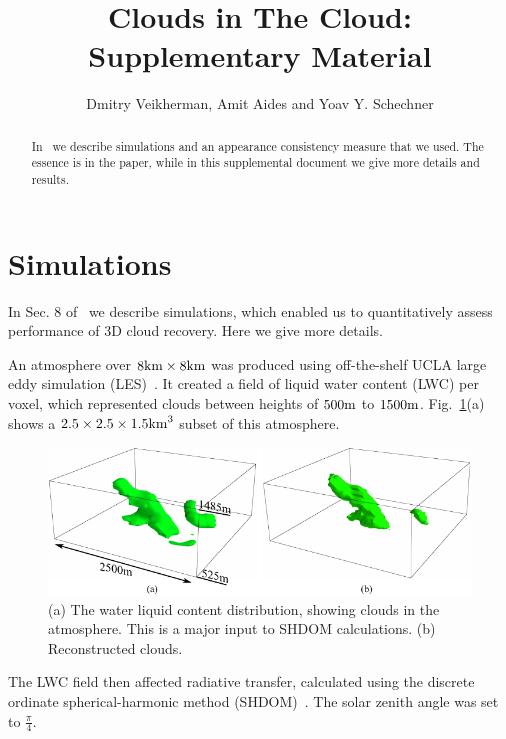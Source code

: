 \documentclass[runningheads]{llncs}
\begin{document}
\pagestyle{headings}
\mainmatter

\title{Clouds in The Cloud:\\
Supplementary Material}


\author{Dmitry Veikherman, Amit Aides and Yoav Y. Schechner}

\maketitle
\begin{abstract}
In~\cite{danny2014} we describe simulations and an appearance consistency measure that we used. The essence is in the paper, while in this supplemental document we give more details and results.

\end{abstract}

\section{Simulations}

In Sec. 8 of~\cite{danny2014} we describe simulations, which enabled us to quantitatively assess performance of 3D cloud recovery. Here we give more details.

An atmosphere over $8{\rm km}\times 8{\rm km}$  was produced using off-the-shelf UCLA large eddy simulation (LES)~\cite{stevens_evaluation_2005}. It created a field of liquid water content (LWC) per voxel, which represented clouds between heights of $500{\rm m}$ to $1500{\rm m}$. Fig.~\ref{fig:simulation_imgs2}(a) shows a $2.5\times 2.5\times 1.5{\rm km}^3$ subset of this atmosphere.
\begin{figure}
  \begin{center}
    \includegraphics{figures/clouds3d_SHDOM}
    \caption{(a) The water liquid content distribution, showing clouds in the atmosphere.
     This is a major input to SHDOM calculations. (b)
      Reconstructed clouds.}
    \label{fig:simulation_imgs2}
  \end{center}
\end{figure}
The LWC field then affected radiative transfer, calculated using the discrete ordinate spherical-harmonic method (SHDOM)~\cite{Evans1998}. The solar zenith angle was set to $\frac{\pi}{4}$.
\end{document}
